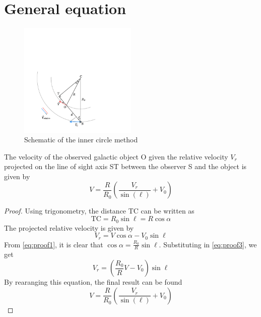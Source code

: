 \section{General equation}
\label{sec:proof_generalised_tangent}
\begin{figure}[htbp]
    \centering
    \includegraphics[width=0.5\textwidth]{figures/inner_circle_method.pdf}
    \caption{Schematic of the inner circle method}
    \label{fig:inner_circle_method}
\end{figure}
%
The velocity of the observed galactic object O given the relative velocity $V_r$ projected on the line of sight axis ST between the observer S and the object is given by
\begin{equation}
    V = \frac{R}{R_0} \left( \frac{V_r}{\sin(\ell)} + V_0 \right)
\end{equation}
\begin{proof}
    Using trigonometry, the distance TC can be written as
    \begin{equation}
       \textrm{TC} = R_0 \sin\ell = R \cos\alpha
       \label{eq:proof1}
    \end{equation}
    The projected relative velocity is given by
    \begin{equation}
        V_r = V \cos\alpha - V_0 \sin\ell
       \label{eq:proof3}
    \end{equation}
    From \autoref{eq:proof1}, it is clear that $\cos\alpha = \frac{R_0}{R} \sin\ell$. Substituting in \autoref{eq:proof3}, we get
    \begin{equation}
        V_r = \left( \frac{R_0}{R} V - V_0 \right) \sin\ell
    \end{equation}
    By rearanging this equation, the final result can be found
    \begin{equation}
        V = \frac{R}{R_0} \left( \frac{V_r}{\sin(\ell)} + V_0 \right)
    \end{equation}
\end{proof}


